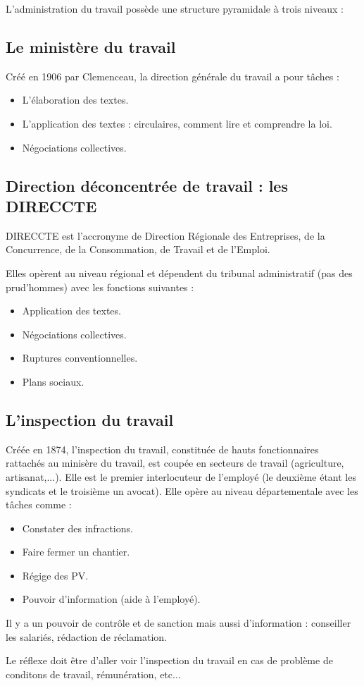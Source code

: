 L'administration du travail possède une structure pyramidale à trois niveaux :

\subsection{Le ministère du travail}
	
	Créé en 1906 par Clemenceau, la direction générale du travail a pour tâches :
	\begin{itemize}
		\item L'élaboration des textes.
		\item L'application des textes : circulaires, comment lire et comprendre la loi.
		\item Négociations collectives.
	\end{itemize}


\subsection{Direction déconcentrée de travail : les DIRECCTE}

	DIRECCTE est l'accronyme de Direction Régionale des Entreprises, de la Concurrence, de la Consommation, de Travail et de l'Emploi.
	
	Elles opèrent au niveau régional et dépendent du tribunal administratif (pas des prud'hommes) avec les fonctions suivantes :
	\begin{itemize}
		\item Application des textes.
		\item Négociations collectives.
		\item Ruptures conventionnelles.
		\item Plans sociaux.
	\end{itemize}


\subsection{L'inspection du travail}

	Créée en 1874, l'inspection du travail, constituée de hauts fonctionnaires rattachés au minisère du travail, est coupée en secteurs de travail (agriculture, artisanat,...).
	Elle est le premier interlocuteur de l'employé (le deuxième étant les syndicats et le troisième un avocat).
	Elle opère au niveau départementale avec les tâches comme :
	\begin{itemize}
		\item Constater des infractions.
		\item Faire fermer un chantier.
		\item Régige des PV.
		\item Pouvoir d'information (aide à l'employé).
	\end{itemize}
	Il y a un pouvoir de contrôle et de sanction mais aussi d'information : conseiller les salariés, rédaction de réclamation.
	
	Le réflexe doit être d'aller voir l'inspection du travail en cas de problème de conditons de travail, rémunération, etc...